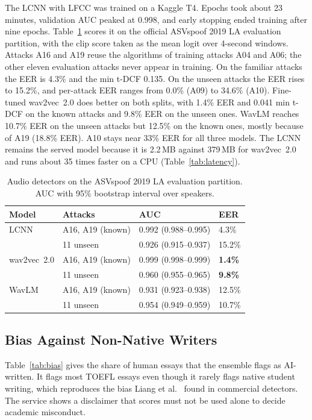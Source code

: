 \documentclass[conference]{IEEEtran}
\begin{document}
The LCNN with LFCC was trained on a Kaggle T4. Epochs took about 23 minutes, validation AUC peaked at 0.998, and early stopping ended training after nine epochs. Table~\ref{tab:audio} scores it on the official ASVspoof 2019 LA evaluation partition, with the clip score taken as the mean logit over 4-second windows. Attacks A16 and A19 reuse the algorithms of training attacks A04 and A06; the other eleven evaluation attacks never appear in training. On the familiar attacks the EER is 4.3\% and the min t-DCF 0.135. On the unseen attacks the EER rises to 15.2\%, and per-attack EER ranges from 0.0\% (A09) to 34.6\% (A10). Fine-tuned wav2vec~2.0 does better on both splits, with 1.4\% EER and 0.041 min t-DCF on the known attacks and 9.8\% EER on the unseen ones. WavLM reaches 10.7\% EER on the unseen attacks but 12.5\% on the known ones, mostly because of A19 (18.8\% EER). A10 stays near 33\% EER for all three models. The LCNN remains the served model because it is 2.2\,MB against 379\,MB for wav2vec~2.0 and runs about 35 times faster on a CPU (Table~\ref{tab:latency}).

\begin{table}[t]
\centering
\caption{Audio detectors on the ASVspoof 2019 LA evaluation partition. AUC with 95\% bootstrap interval over speakers.}
\label{tab:audio}
\begin{tabular}{llll}
\toprule
\textbf{Model} & \textbf{Attacks} & \textbf{AUC} & \textbf{EER} \\
\midrule
LCNN & A16, A19 (known) & 0.992 (0.988--0.995) & 4.3\% \\
 & 11 unseen & 0.926 (0.915--0.937) & 15.2\% \\
wav2vec~2.0 & A16, A19 (known) & 0.999 (0.998--0.999) & \textbf{1.4\%} \\
 & 11 unseen & 0.960 (0.955--0.965) & \textbf{9.8\%} \\
WavLM & A16, A19 (known) & 0.931 (0.923--0.938) & 12.5\% \\
 & 11 unseen & 0.954 (0.949--0.959) & 10.7\% \\
\bottomrule
\end{tabular}
\end{table}

\subsection{Bias Against Non-Native Writers}
Table~\ref{tab:bias} gives the share of human essays that the ensemble flags as AI-written. It flags most TOEFL essays even though it rarely flags native student writing, which reproduces the bias Liang et al.~\cite{liang2023gpt} found in commercial detectors. The service shows a disclaimer that scores must not be used alone to decide academic misconduct.
\end{document}
